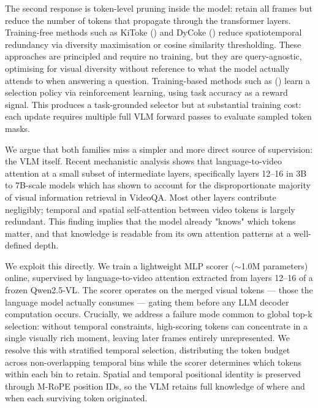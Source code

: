 \documentclass[12pt]{article}
\begin{document}
The second response is token-level pruning inside the model: retain all frames but reduce the number of tokens that propagate through the transformer layers. Training-free methods such as KiToke (\cite{huang2026kitokekernelbasedintervalawaretoken}) and DyCoke (\cite{tao2025dycokedynamiccompressiontokens}) reduce spatiotemporal redundancy via diversity maximisation or cosine similarity thresholding. These approaches are principled and require no training, but they are query-agnostic, optimising for visual diversity without reference to what the model actually attends to when answering a question. Training-based methods such as (\cite{wang2026dynamictokencompressionefficient}) learn a selection policy via reinforcement learning, using task accuracy as a reward signal. This produces a task-grounded selector but at substantial training cost: each update requires multiple full VLM forward passes to evaluate sampled token masks.

We argue that both families miss a simpler and more direct source of supervision: the VLM itself. Recent mechanistic analysis \cite{gou2025empiricalstudyvideollmsanswer} shows that language-to-video attention at a small subset of intermediate layers, specifically layers 12–16 in 3B to 7B-scale models which has shown to account for the disproportionate majority of visual information retrieval in VideoQA. Most other layers contribute negligibly; temporal and spatial self-attention between video tokens is largely redundant. This finding implies that the model already "knows" which tokens matter, and that knowledge is readable from its own attention patterns at a well-defined depth.

We exploit this directly. We train a lightweight MLP scorer ($\sim$1.0M parameters) online, supervised by language-to-video attention extracted from layers 12–16 of a frozen Qwen2.5-VL. The scorer operates on the merged visual tokens — those the language model actually consumes — gating them before any LLM decoder computation occurs. Crucially, we address a failure mode common to global top-k selection: without temporal constraints, high-scoring tokens can concentrate in a single visually rich moment, leaving later frames entirely unrepresented. We resolve this with stratified temporal selection, distributing the token budget across non-overlapping temporal bins while the scorer determines which tokens within each bin to retain. Spatial and temporal positional identity is preserved through M-RoPE position IDs, so the VLM retains full knowledge of where and when each surviving token originated.
\end{document}
